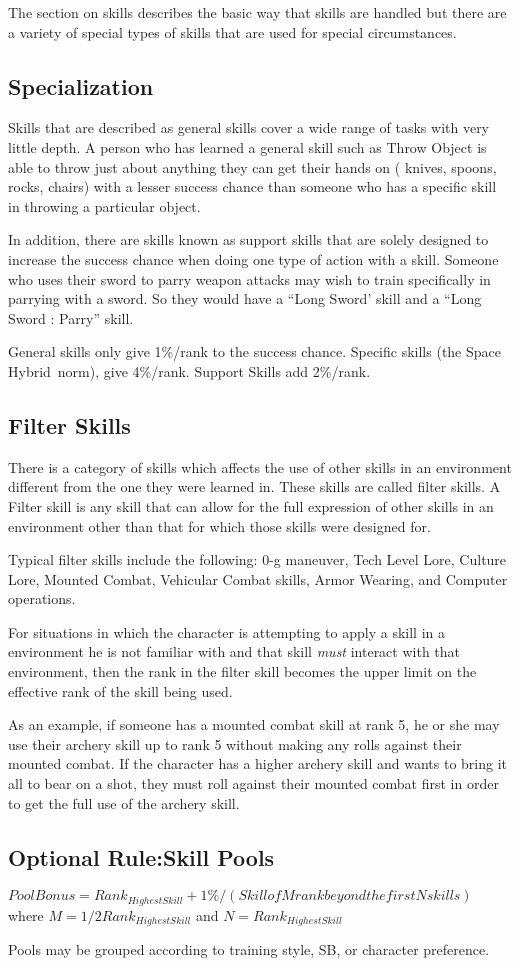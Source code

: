 The section on skills describes the basic way that skills are 
handled but there are a variety of special types of skills that are 
used for special circumstances.

\subsection{Specialization}

Skills that are described as general skills cover a wide range of 
tasks with very little depth. A person who has learned a general 
skill such as Throw Object is able to throw just about anything they 
can get their hands on ( knives, spoons, rocks, chairs) with a lesser 
success chance than someone who has a specific skill in throwing a
particular object.

In addition, there are skills known as support skills that are solely 
designed to increase the success chance when doing one type of action 
with a skill. Someone who uses their sword to parry weapon attacks 
may wish to train specifically in parrying with a sword. So they 
would have a ``Long Sword' skill and a ``Long Sword : Parry'' skill.

General skills only give 1\%/rank to the success chance. Specific 
skills (the Space Hybrid\ norm), give 4\%/rank. Support Skills add 2\%/rank.

\subsection{Filter Skills}

There is a category of skills which affects the use of other skills 
in an environment different from the one they were learned in. These skills 
are called filter skills. A Filter skill is any skill that can allow 
for the full expression of other skills in an environment other than 
that for which those skills were designed for.

Typical filter skills include the following: 0-g maneuver, Tech 
Level Lore, Culture Lore, Mounted Combat, Vehicular Combat 
skills, Armor Wearing, and Computer operations.

For situations in which the character is attempting to apply a skill 
in a environment he is not familiar with and that skill {\em must }
interact with that environment, then the rank in the filter skill 
becomes the upper limit on the effective rank of the skill being 
used.

As an example, if someone has a mounted combat skill at rank 5, he or she
may use their archery skill up to rank 5 without making any rolls
against their mounted combat. If the character has a higher archery skill
and wants to bring it all to bear on a shot, they must roll against
their mounted combat first in order to get the full use of the archery
skill.

\subsection{Optional Rule:Skill Pools}

$ Pool Bonus = Rank_{Highest Skill} + 1\%/(Skill of M rank beyond the
first N skills ) $ where $ M = 1/2 Rank_{Highest Skill} $ and $ N =
Rank_{Highest Skill} $

Pools may be grouped according to training style, SB, or character
preference. 
